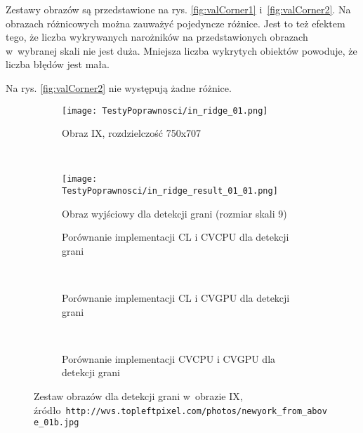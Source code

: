 Zestawy obrazów są przedstawione na rys. \ref{fig:valCorner1} i~\ref{fig:valCorner2}. Na obrazach różnicowych można zauważyć pojedyncze różnice. Jest to też efektem tego, że liczba wykrywanych narożników na przedstawionych obrazach w~wybranej skali nie jest duża. Mniejsza liczba wykrytych obiektów powoduje, że liczba błędów jest mała.

Na rys. \ref{fig:valCorner2} nie występują żadne różnice.

\begin{figure}[H]

\begin{center}
\begin{subfigure}[t]{0.3\textwidth}
\texttt{[image: TestyPoprawnosci/in\_ridge\_01.png]}
\caption{Obraz IX, rozdzielczość 750x707}
\label{fig:valRidge01}
\end{subfigure}
~
\begin{subfigure}[t]{0.3\textwidth}
\texttt{[image: TestyPoprawnosci/in\_ridge\_result\_01\_01.png]}
\caption{Obraz wyjściowy dla detekcji grani (rozmiar skali 9)}
\label{fig:valRidgeResult01}
\end{subfigure}
\end{center}

\begin{subfigure}[t]{0.3\textwidth}
	\centering
	\setlength\fboxsep{0pt}
	\setlength\fboxrule{0.5pt}
	\caption{Porównanie implementacji CL i CVCPU dla detekcji grani}
	\label{fig:valRidge1CLCVCPU}
\end{subfigure}
~
\begin{subfigure}[t]{0.3\textwidth}
	\centering
	\setlength\fboxsep{0pt}
	\setlength\fboxrule{0.5pt}
	\caption{Porównanie implementacji CL i CVGPU dla detekcji grani}
	\label{fig:valRidge1CLCVGPU}
\end{subfigure}
~
\begin{subfigure}[t]{0.3\textwidth}
	\centering
	\setlength\fboxsep{0pt}
	\setlength\fboxrule{0.5pt}
	\caption{Porównanie implementacji CVCPU i CVGPU dla detekcji grani}
	\label{fig:valRidge1CVCPUCVGPU}                 
\end{subfigure}
\caption{Zestaw obrazów dla detekcji grani w~obrazie IX, \tiny{źródło~\texttt{http://wvs.topleftpixel.com/photos/newyork\_from\_above\_01b.jpg}}}

\label{fig:valRidge1}
\end{figure}

